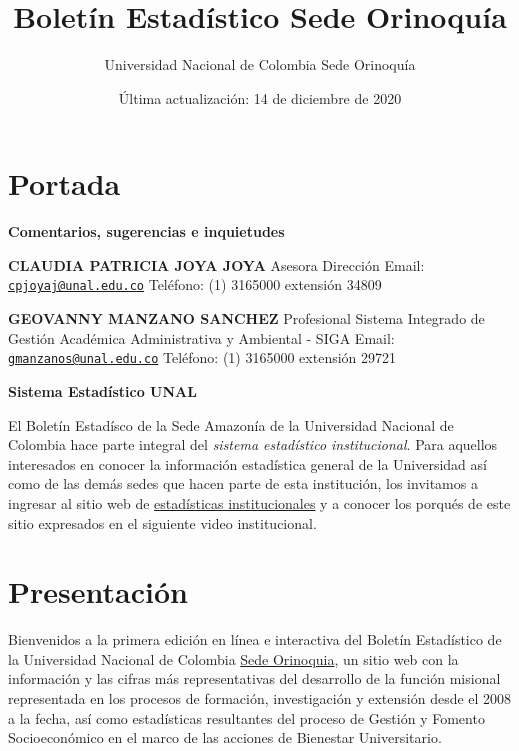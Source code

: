 \documentclass[
]{book}
\title{Boletín Estadístico Sede Orinoquía}
\author{ Universidad Nacional de Colombia Sede Orinoquía}
\date{Última actualización: 14 de diciembre de 2020}
\begin{document}
\maketitle

{
\setcounter{tocdepth}{1}
\tableofcontents
}
\hypertarget{portada}{%
\chapter*{Portada}\label{portada}}

\textbf{Comentarios, sugerencias e inquietudes}

\textbf{CLAUDIA PATRICIA JOYA JOYA}
Asesora Dirección
Email: \href{mailto:cpjoyaj@unal.edu.co}{\nolinkurl{cpjoyaj@unal.edu.co}}
Teléfono: (1) 3165000 extensión 34809

\textbf{GEOVANNY MANZANO SANCHEZ}
Profesional Sistema Integrado de Gestión Académica Administrativa y Ambiental - SIGA
Email: \href{mailto:gmanzanos@unal.edu.co}{\nolinkurl{gmanzanos@unal.edu.co}}
Teléfono: (1) 3165000 extensión 29721

\textbf{Sistema Estadístico UNAL}

El Boletín Estadísco de la Sede Amazonía de la Universidad Nacional de Colombia hace parte integral del \emph{sistema estadístico institucional}. Para aquellos interesados en conocer la información estadística general de la Universidad así como de las demás sedes que hacen parte de esta institución, los invitamos a ingresar al sitio web de \href{http://estadisticas.unal.edu.co/home/}{estadísticas institucionales} y a conocer los porqués de este sitio expresados en el siguiente video institucional.

\hypertarget{Presenta}{%
\chapter*{Presentación}\label{Presenta}}

Bienvenidos a la primera edición en línea e interactiva del Boletín Estadístico de la Universidad Nacional de Colombia \href{http://orinoquia.unal.edu.co/}{Sede Orinoquia}, un sitio web con la información y las cifras más representativas del desarrollo de la función misional representada en los procesos de formación, investigación y extensión desde el 2008 a la fecha, así como estadísticas resultantes del proceso de Gestión y Fomento Socioeconómico en el marco de las acciones de Bienestar Universitario.
\end{document}
